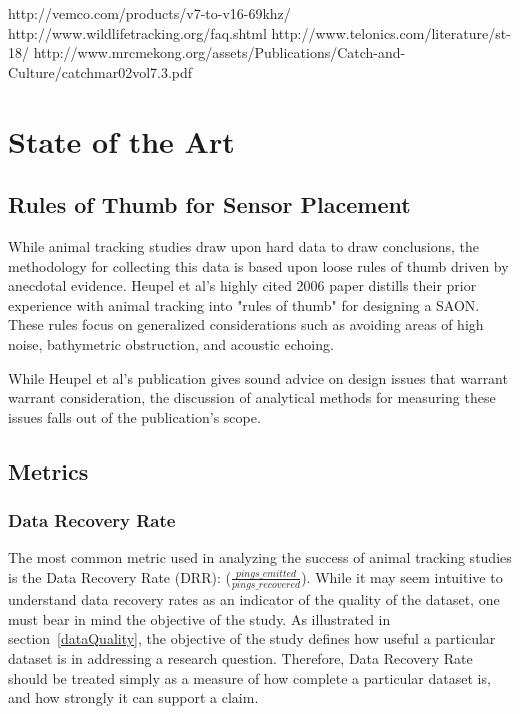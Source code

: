 http://vemco.com/products/v7-to-v16-69khz/
http://www.wildlifetracking.org/faq.shtml
http://www.telonics.com/literature/st-18/
http://www.mrcmekong.org/assets/Publications/Catch-and-Culture/catchmar02vol7.3.pdf










\section{State of the Art}

\subsection{Rules of Thumb for Sensor Placement}
\label{RulesOfThumb}
While animal tracking studies draw upon hard data to draw conclusions, the methodology for collecting this data is based upon loose rules of thumb driven by anecdotal evidence.  Heupel et al's highly cited 2006 paper distills their prior experience with animal tracking into "rules of thumb" for designing a SAON.  These rules focus on generalized considerations such as avoiding areas of high noise, bathymetric obstruction, and acoustic echoing\cite{Heupel2006}.  

While Heupel et al's publication gives sound advice on design issues that warrant warrant consideration, the discussion of analytical methods for measuring these issues falls out of the publication's scope.


\subsection{Metrics}
\subsubsection{Data Recovery Rate}
\label{dataRecoveryRate}
The most common metric used in analyzing the success of animal tracking studies is the Data Recovery Rate (DRR): ($\frac{pings\_emitted}{pings\_recovered}$).  While it may seem intuitive to understand data recovery rates as an indicator of the quality of the dataset, one must bear in mind the objective of the study.  As illustrated in section~\ref{dataQuality}, the objective of the study defines how useful a particular dataset is in addressing a research question.  Therefore, Data Recovery Rate should be treated simply as a measure of how complete a particular dataset is, and how strongly it can support a claim.  

